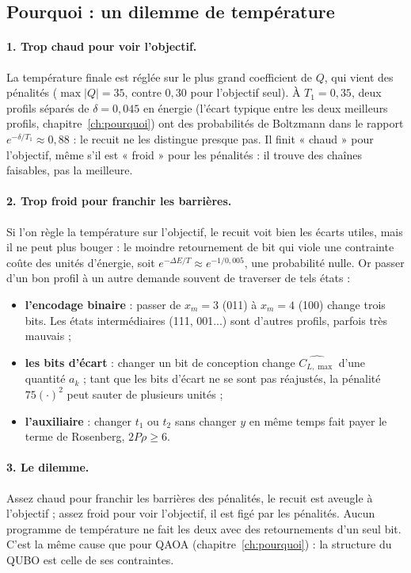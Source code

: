 \subsection{Pourquoi : un dilemme de température}
\paragraph{1. Trop chaud pour voir l'objectif.} La température finale est réglée sur le plus grand coefficient de $Q$, qui vient des pénalités ($\max|Q|=35$, contre $0{,}30$ pour l'objectif seul). À $T_1=0{,}35$, deux profils séparés de $\delta=0{,}045$ en énergie (l'écart typique entre les deux meilleurs profils, chapitre~\ref{ch:pourquoi}) ont des probabilités de Boltzmann dans le rapport $e^{-\delta/T_1}\approx0{,}88$ : le recuit ne les distingue presque pas. Il finit « chaud » pour l'objectif, même s'il est « froid » pour les pénalités : il trouve des chaînes faisables, pas la meilleure.

\paragraph{2. Trop froid pour franchir les barrières.} Si l'on règle la température sur l'objectif, le recuit voit bien les écarts utiles, mais il ne peut plus bouger : le moindre retournement de bit qui viole une contrainte coûte des unités d'énergie, soit $e^{-\Delta E/T}\approx e^{-1/0{,}005}$, une probabilité nulle. Or passer d'un bon profil à un autre demande souvent de traverser de tels états :
\begin{itemize}
\item \textbf{l'encodage binaire} : passer de $x_m=3$ (011) à $x_m=4$ (100) change trois bits. Les états intermédiaires (111, 001...) sont d'autres profils, parfois très mauvais ;
\item \textbf{les bits d'écart} : changer un bit de conception change $\widehat{C_{L,\max}}$ d'une quantité $a_k$ ; tant que les bits d'écart ne se sont pas réajustés, la pénalité $75(\cdot)^2$ peut sauter de plusieurs unités ;
\item \textbf{l'auxiliaire} : changer $t_1$ ou $t_2$ sans changer $y$ en même temps fait payer le terme de Rosenberg, $2P\rho\ge6$.
\end{itemize}

\paragraph{3. Le dilemme.} Assez chaud pour franchir les barrières des pénalités, le recuit est aveugle à l'objectif ; assez froid pour voir l'objectif, il est figé par les pénalités. Aucun programme de température ne fait les deux avec des retournements d'un seul bit. C'est la même cause que pour QAOA (chapitre~\ref{ch:pourquoi}) : la structure du QUBO est celle de ses contraintes.

